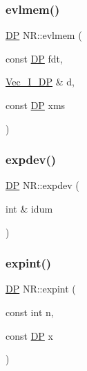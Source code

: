\mbox{\label{namespaceNR_acf9bcd45ac074c4fc27723f2093d332e}} 
\subsubsection{\texorpdfstring{evlmem()}{evlmem()}}
{\footnotesize\ttfamily \mbox{\hyperlink{namespaceNR_af6ff762dd605ff477b8e52387253a02a}{DP}} N\+R\+::evlmem (\begin{DoxyParamCaption}\item[{const \mbox{\hyperlink{namespaceNR_af6ff762dd605ff477b8e52387253a02a}{DP}}}]{fdt,  }\item[{\mbox{\hyperlink{namespaceNR_a9f943da53862537c552e2a770cb170ae}{Vec\+\_\+\+I\+\_\+\+DP}} \&}]{d,  }\item[{const \mbox{\hyperlink{namespaceNR_af6ff762dd605ff477b8e52387253a02a}{DP}}}]{xms }\end{DoxyParamCaption})}

\mbox{\label{namespaceNR_aa445323c2e4f1c7d6859208169d37307}} 
\subsubsection{\texorpdfstring{expdev()}{expdev()}}
{\footnotesize\ttfamily \mbox{\hyperlink{namespaceNR_af6ff762dd605ff477b8e52387253a02a}{DP}} N\+R\+::expdev (\begin{DoxyParamCaption}\item[{int \&}]{idum }\end{DoxyParamCaption})}

\mbox{\label{namespaceNR_a03af1157f0cf4a00d857e0dde2483104}} 
\subsubsection{\texorpdfstring{expint()}{expint()}}
{\footnotesize\ttfamily \mbox{\hyperlink{namespaceNR_af6ff762dd605ff477b8e52387253a02a}{DP}} N\+R\+::expint (\begin{DoxyParamCaption}\item[{const int}]{n,  }\item[{const \mbox{\hyperlink{namespaceNR_af6ff762dd605ff477b8e52387253a02a}{DP}}}]{x }\end{DoxyParamCaption})}

